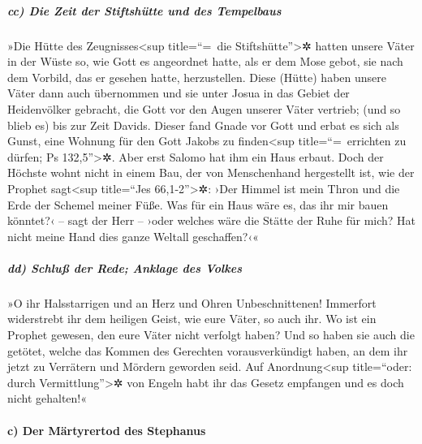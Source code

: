 \hypertarget{cc-die-zeit-der-stiftshuxfctte-und-des-tempelbaus}{%
\subparagraph{cc) Die Zeit der Stiftshütte und des
Tempelbaus}\label{cc-die-zeit-der-stiftshuxfctte-und-des-tempelbaus}}

 »Die Hütte des Zeugnisses\textless sup title=``=~die
Stiftshütte''\textgreater✲ hatten unsere Väter in der Wüste so, wie Gott
es angeordnet hatte, als er dem Mose gebot, sie nach dem Vorbild, das er
gesehen hatte, herzustellen.  Diese (Hütte) haben unsere
Väter dann auch übernommen und sie unter Josua in das Gebiet der
Heidenvölker gebracht, die Gott vor den Augen unserer Väter vertrieb;
(und so blieb es) bis zur Zeit Davids.  Dieser fand Gnade
vor Gott und erbat es sich als Gunst, eine Wohnung für den Gott Jakobs
zu finden\textless sup title=``=~errichten zu dürfen; Ps
132,5''\textgreater✲.  Aber erst Salomo hat ihm ein Haus
erbaut.  Doch der Höchste wohnt nicht in einem Bau, der
von Menschenhand hergestellt ist, wie der Prophet sagt\textless sup
title=``Jes 66,1-2''\textgreater✲:  ›Der Himmel ist mein
Thron und die Erde der Schemel meiner Füße. Was für ein Haus wäre es,
das ihr mir bauen könntet?‹ -- sagt der Herr -- ›oder welches wäre die
Stätte der Ruhe für mich?  Hat nicht meine Hand dies
ganze Weltall geschaffen?‹«

\hypertarget{dd-schluuxdf-der-rede-anklage-des-volkes}{%
\subparagraph{dd) Schluß der Rede; Anklage des
Volkes}\label{dd-schluuxdf-der-rede-anklage-des-volkes}}

 »O ihr Halsstarrigen und an Herz und Ohren
Unbeschnittenen! Immerfort widerstrebt ihr dem heiligen Geist, wie eure
Väter, so auch ihr.  Wo ist ein Prophet gewesen, den eure
Väter nicht verfolgt haben? Und so haben sie auch die getötet, welche
das Kommen des Gerechten vorausverkündigt haben, an dem ihr jetzt zu
Verrätern und Mördern geworden seid.  Auf
Anordnung\textless sup title=``oder: durch Vermittlung''\textgreater✲
von Engeln habt ihr das Gesetz empfangen und es doch nicht gehalten!«

\hypertarget{c-der-muxe4rtyrertod-des-stephanus}{%
\paragraph{c) Der Märtyrertod des
Stephanus}\label{c-der-muxe4rtyrertod-des-stephanus}}

